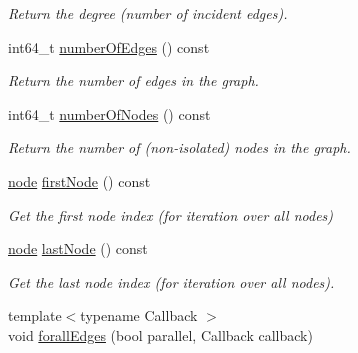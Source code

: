 \begin{DoxyCompactItemize}
\begin{DoxyCompactList}\small\item\em Return the degree (number of incident edges). \end{DoxyCompactList}\item 
int64\-\_\-t \hyperlink{class_ensemble_clustering_1_1_graph_ab019840b239c3247eaf00e5ffcc6bb03}{number\-Of\-Edges} () const 
\begin{DoxyCompactList}\small\item\em Return the number of edges in the graph. \end{DoxyCompactList}\item 
int64\-\_\-t \hyperlink{class_ensemble_clustering_1_1_graph_affe61a24e54266aba872272fb9501c61}{number\-Of\-Nodes} () const 
\begin{DoxyCompactList}\small\item\em Return the number of (non-\/isolated) nodes in the graph. \end{DoxyCompactList}\item 
\hyperlink{namespace_ensemble_clustering_ae829290aeccd1a420b17a37fd901f114}{node} \hyperlink{class_ensemble_clustering_1_1_graph_aaac8bcc5d64461cba54ad38ec929be3c}{first\-Node} () const 
\begin{DoxyCompactList}\small\item\em Get the first node index (for iteration over all nodes) \end{DoxyCompactList}\item 
\hyperlink{namespace_ensemble_clustering_ae829290aeccd1a420b17a37fd901f114}{node} \hyperlink{class_ensemble_clustering_1_1_graph_a3d6fe2d0c27605f4b55585198eb9b933}{last\-Node} () const 
\begin{DoxyCompactList}\small\item\em Get the last node index (for iteration over all nodes). \end{DoxyCompactList}\item 
{\footnotesize template$<$typename Callback $>$ }\\void \hyperlink{class_ensemble_clustering_1_1_graph_a7b599771f8dc476712ea7e6b52157a3f}{forall\-Edges} (bool parallel, Callback callback)
\end{DoxyCompactItemize}
